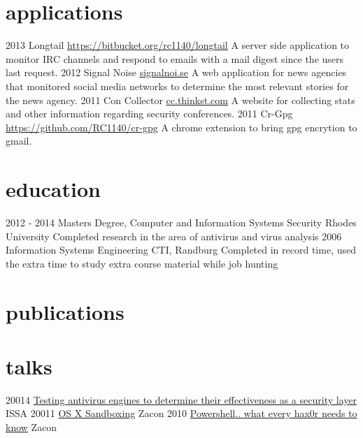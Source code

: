 \documentclass[]{jameel-cv}
\begin{document}
\section{applications}

\begin{entrylist}
   \entry
    {2013}
    {Longtail}
    {\href{https://bitbucket.org/rc1140/longtail}{https://bitbucket.org/rc1140/longtail}}
    {A server side application to monitor IRC channels and respond to emails with a mail digest since the users last request.}
  \entry
    {2012}
    {Signal Noise}
    {\href{http://signalnoi.se}{signalnoi.se}}
    {A web application for news agencies that monitored social media networks to determine the most relevant stories for the news agency.}
  \entry
    {2011}
    {Con Collector}
    {\href{http://cc.thinkst.com}{cc.thinkst.com}}
    {A website for collecting stats and other information regarding security conferences.}
  \entry
    {2011}
    {Cr-Gpg}
    {\href{https://github.com/RC1140/cr-gpg}{https://github.com/RC1140/cr-gpg}}
    {A chrome extension to bring gpg encrytion to gmail.}
\end{entrylist}

\section{education}

\begin{entrylist}
  \entry
    {2012 - 2014}
    {Masters Degree, Computer and Information Systems Security}
    {Rhodes University}
    {Completed research in the area of antivirus and virus analysis}
  \entry
    {2006}
    {Information Systems Engineering}
    {CTI, Randburg}
    {Completed in record time, used the extra time to study extra course material while job hunting}
\end{entrylist}

\newpage

\section{publications}
\nocite{*}
\printbibliography[heading=none]

\section{talks}
\begin{entrylist}
   \entry
    {20014}
    {\href{https://speakerdeck.com/rc1140/testing-antivirus-engines-to-determine-their-effectiveness-as-a-security-layer}{Testing antivirus engines to determine their effectiveness as a security layer}}
    {ISSA}
    {}
  \entry
    {20011}
    {\href{https://speakerdeck.com/rc1140/mac-os-sandboxing}{OS X Sandboxing}}
    {Zacon}
    {}
  \entry
    {2010}
    {\href{https://speakerdeck.com/rc1140/powershell-what-every-haxor-needs-to-know}{Powershell.. what every hax0r needs to know}}
    {Zacon}
    {}
\end{entrylist}
\end{document}
